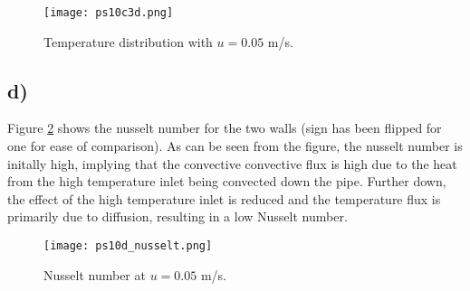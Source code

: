 \documentclass{article}
\begin{document}
\begin{figure}
\texttt{[image: ps10c3d.png]}
\caption{Temperature distribution with $u=0.05$ m/s.}
\label{fig:temp-c}
\end{figure}

\subsection{d)}
Figure \ref{fig:nusselt-d} shows the nusselt number for the two walls (sign has been flipped for one for ease of comparison). As can be seen from the figure, the nusselt number is initally high, implying that the convective convective flux is high due to the heat from the high temperature inlet being convected down the pipe. Further down, the effect of the high temperature inlet is reduced and the temperature flux is primarily due to diffusion, resulting in a low Nusselt number.

\begin{figure}
\texttt{[image: ps10d\_nusselt.png]}
\caption{Nusselt number at $u=0.05$ m/s.}
\label{fig:nusselt-d}
\end{figure}
\end{document}
